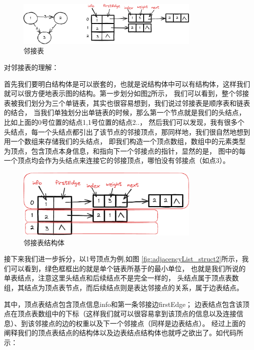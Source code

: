 \documentclass[lang=cn,newtx,10pt,scheme=chinese]{elegantbook}
\begin{document}
\begin{figure}[h!]
  \centering
  \includegraphics[width=0.8\textwidth]{./figure/pdf/cropped/adjacencyList.pdf}
  \caption{邻接表}
  \label{fig:adjacencyList}
\end{figure}

对邻接表的理解：

首先我们要明白结构体是可以嵌套的，也就是说结构体中可以有结构体，这样我们就可以很方便地表示图的结构。第一步划分如图\ref{fig:adjacencyList_struct}所示，
我们可以看到，整个邻接表被我们划分为三个单链表，其实也很容易想到，我们说过邻接表是顺序表和链表的结合，
当我们单独划分出单链表的时候，那么第一个节点就是我们的头结点，比如上面的0号位置的结点1,1号位置的结点2..，
然后我们可以发现，我有很多个头结点，每一个头结点都引出了该节点的邻接顶点，那同样地，我们很自然地想到用一个数组来存储我们的头结点，
即我们构造一个顶点数组，数组中的元素类型为顶点，包含顶点本身信息，和指向下一个邻接点的指针，显然的是，
图中的每一个顶点均会作为头结点来连接它的邻接顶点，哪怕没有邻接点（如点3）。

\begin{figure}[h!]
  \centering
  \includegraphics[width=0.8\textwidth]{./figure/pdf/cropped/adjacencyList_struct.pdf}
  \caption{邻接表结构体}
  \label{fig:adjacencyList_struct}
\end{figure}

接下来我们进一步拆分，以1号顶点为例,如图 \ref{fig:adjacencyList_struct2}所示，我们可以看到，绿色框框出的就是单个链表所基于的最小单位，
也就是我们所说的单表结点，注意这里头结点和后续结点不是完全一样的，
头结点属于顶点表数组，其结点为顶点表节点，而后续结点则是表达邻接点的关系，属于边表结点。

其中，顶点表结点包含顶点信息info和第一条邻接边firstEdge；
边表结点包含该顶点在顶点表数组中的下标（这样我们就可以很容易拿到该顶点的信息以及连接信息）、到该邻接点的边的权重以及下一个邻接点（同样是边表结点）。
经过上面的阐释我们的顶点表结点的结构体以及边表结点结构体也就呼之欲出了。如代码所示：
\end{document}
